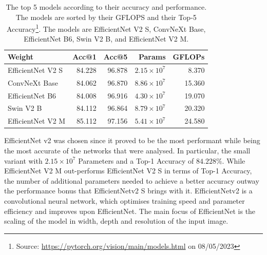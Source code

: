 \begin{table}[ht]
  \caption[Top 5 models for Accuracy and Performance]{The top 5 models according to their accuracy and performance. The models are sorted by their GFLOPS and their Top-5 Accuracy\footnote{Source: \url{https://pytorch.org/vision/main/models.html} on 08/05/2023}. The models are EfficientNet V2 S, ConvNeXt Base, EfficientNet B6, Swin V2 B, and EfficientNet V2 M.}
  \label{tab:network_comparison}
  \centering
  \begin{tabular}{lrrrr}
    \hline
            Weight &  Acc@1 &  Acc@5 &   Params &  GFLOPs \\
    \hline
  EfficientNet V2 S & 84.228 & 96.878 & $2.15 \times 10^7$ &   8.370 \\
      ConvNeXt Base & 84.062 & 96.870 & $8.86 \times 10^7$ &  15.360 \\
    EfficientNet B6 & 84.008 & 96.916 & $4.30 \times 10^7$ &  19.070 \\
          Swin V2 B & 84.112 & 96.864 & $8.79 \times 10^7$ &  20.320 \\
  EfficientNet V2 M & 85.112 & 97.156 & $5.41 \times 10^7$ &  24.580 \\
  \hline
  \end{tabular}
\end{table}

EfficientNet v2 was chosen since it proved to be the most performant while being the most accurate of the networks that were analysed. In particular, the small variant with $2.15 \times 10^7$ Parameters and a Top-1 Accuracy of $84.228\%$\cite{tan2021efficientnetv2}.  While EfficientNet V2 M out-performs EfficientNet V2 S in terms of Top-1 Accuracy, the number of additional parameters needed to achieve a better accuracy outway the performance bonus that EfficientNetv2 S brings with it. EfficientNetv2 is a convolutional neural network, which optimises training speed and parameter efficiency and improves upon EfficientNet\cite{tan2020efficientnet}. The main focus of EfficientNet is the scaling of the model in width, depth and resolution of the input image. 
